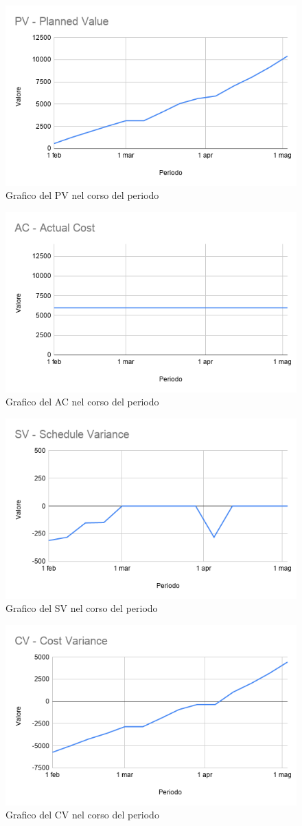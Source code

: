 \begin{figure}[H]
	\centering
	\includegraphics[width=0.7\linewidth]{res/images/PV.png}
	\caption{Grafico del PV nel corso del periodo}
	\label{fig:Figura3}
\end{figure}

\begin{figure}[H]
	\centering
	\includegraphics[width=0.7\linewidth]{res/images/AC.png}
	\caption{Grafico del AC nel corso del periodo}
	\label{fig:Figura4}
\end{figure}

\begin{figure}[H]
	\centering
	\includegraphics[width=0.7\linewidth]{res/images/SV.png}
	\caption{Grafico del SV nel corso del periodo}
	\label{fig:Figura5}
\end{figure}

\begin{figure}[H]
	\centering
	\includegraphics[width=0.7\linewidth]{res/images/CV.png}
	\caption{Grafico del CV nel corso del periodo}
	\label{fig:Figura6}
\end{figure}
